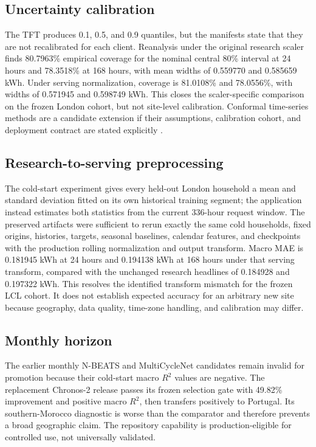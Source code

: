 \subsection{Uncertainty calibration}

The TFT produces 0.1, 0.5, and 0.9 quantiles, but the manifests state that they are not recalibrated for each client. Reanalysis under the original research scaler finds 80.7963\% empirical coverage for the nominal central 80\% interval at 24 hours and 78.3518\% at 168 hours, with mean widths of 0.559770 and 0.585659 kWh. Under serving normalization, coverage is 81.0108\% and 78.0556\%, with widths of 0.571945 and 0.598749 kWh. This closes the scaler-specific comparison on the frozen London cohort, but not site-level calibration. Conformal time-series methods are a candidate extension if their assumptions, calibration cohort, and deployment contract are stated explicitly \cite{stankeviciute2021conformal}.

\subsection{Research-to-serving preprocessing}

The cold-start experiment gives every held-out London household a mean and standard deviation fitted on its own historical training segment; the application instead estimates both statistics from the current 336-hour request window. The preserved artifacts were sufficient to rerun exactly the same cold households, fixed origins, histories, targets, seasonal baselines, calendar features, and checkpoints with the production rolling normalization and output transform. Macro MAE is 0.181945 kWh at 24 hours and 0.194138 kWh at 168 hours under that serving transform, compared with the unchanged research headlines of 0.184928 and 0.197322 kWh. This resolves the identified transform mismatch for the frozen LCL cohort. It does not establish expected accuracy for an arbitrary new site because geography, data quality, time-zone handling, and calibration may differ.

\subsection{Monthly horizon}

The earlier monthly N-BEATS and MultiCycleNet candidates remain invalid for promotion because their cold-start macro $R^2$ values are negative. The replacement Chronos-2 release passes its frozen selection gate with 49.82\% improvement and positive macro $R^2$, then transfers positively to Portugal. Its southern-Morocco diagnostic is worse than the comparator and therefore prevents a broad geographic claim. The repository capability is production-eligible for controlled use, not universally validated.

